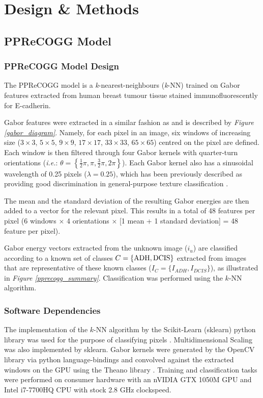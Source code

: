 \chapter{Design \& Methods}
\section{PPReCOGG Model}
\subsection{PPReCOGG Model Design}
The PPReCOGG model is a \emph{k}-nearest-neighbours (\emph{k}-NN) trained on Gabor features extracted from human breast tumour tissue stained immunofluorescently for E-cadherin.\par

Gabor features were extracted in a similar fashion as \cite{melendez2008} and is described by \emph{Figure \ref{gabor_diagram}}. Namely, for each 
pixel in an image, six windows of increasing size ($3\times3$, $5\times5$, $9\times9$, 
$17\times17$, $33\times33$, $65\times65$) centred on the pixel are defined. 
Each window is then filtered through four Gabor kernels with quarter-turn 
orientations (\emph{i.e.}: $\theta = \left\{\frac{1}{2}\pi, \pi, \frac{3}{2}\pi, 
2\pi \right\}$). Each Gabor kernel also has a sinusoidal wavelength of 0.25 pixels 
($\lambda = 0.25$), which has been previously described as providing good 
discrimination in general-purpose texture classification \citep{manjunath1996}.\par

The mean and the standard deviation of the resulting Gabor energies are then
added to a vector for the relevant pixel. This results in a total of 48 features
per pixel (6 windows $\times$ 4 orientations $\times$ [1 mean + 1 standard deviation] = 48
feature per pixel).\par

Gabor energy vectors extracted from the unknown image ($i_u$) are classified according to a known set of classes $C = \{\textnormal{ADH}, \textnormal{DCIS}\}$ extracted from images that are representative of these known classes ($I_C = \{I_{ADH}, I_{DCIS}\}$), as illustrated in \emph{Figure \ref{pprecogg_summary}}. Classification was performed using the $k$-NN algorithm.

\subsection{Software Dependencies}
The implementation of the $k$-NN algorithm by the Scikit-Learn (sklearn) python library was used for the purpose of classifying pixels \citep{pedregosa2011}. Multidimensional Scaling was also implemented by sklearn. Gabor kernels were generated by the OpenCV library via python language-bindings \citep{opencv_library} and convolved against the extracted windows on the GPU using the Theano library \citep{alrfou2016}. Training and classification tasks were performed on consumer hardware with an nVIDIA GTX 1050M GPU and Intel i7-7700HQ CPU with stock 2.8 GHz clockspeed.\par


